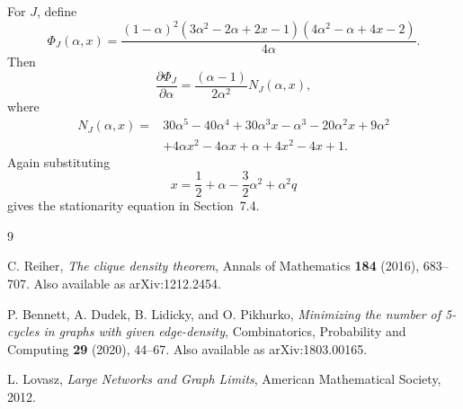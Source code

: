 \documentclass[11pt]{amsart}
\theoremstyle{definition}
\newcommand{\1}{\mathbf 1}
\begin{document}
For $J$, define
\[
   \Phi_J(\alpha,x)=
   \frac{(1-\alpha)^2
     (3\alpha^2-2\alpha+2x-1)
     (4\alpha^2-\alpha+4x-2)}{4\alpha}.
\]
Then
\[
\frac{\partial \Phi_J}{\partial \alpha}
=\frac{(\alpha-1)}{2\alpha^2}N_J(\alpha,x),
\]
where
\[
\begin{split}
N_J(\alpha,x)={}&30\alpha^5-40\alpha^4+30\alpha^3x-\alpha^3
-20\alpha^2x+9\alpha^2\\
&+4\alpha x^2-4\alpha x+\alpha+4x^2-4x+1.
\end{split}
\]
Again substituting
\[
   x=\frac12+\alpha-\frac32\alpha^2+\alpha^2q
\]
gives the stationarity equation in Section~7.4.

\begin{thebibliography}{9}

C. Reiher,
\emph{The clique density theorem},
Annals of Mathematics \textbf{184} (2016), 683--707.
Also available as arXiv:1212.2454.

P. Bennett, A. Dudek, B. Lidicky, and O. Pikhurko,
\emph{Minimizing the number of 5-cycles in graphs with given edge-density},
Combinatorics, Probability and Computing \textbf{29} (2020), 44--67.
Also available as arXiv:1803.00165.

L. Lovasz,
\emph{Large Networks and Graph Limits},
American Mathematical Society, 2012.

\end{thebibliography}
\end{document}

